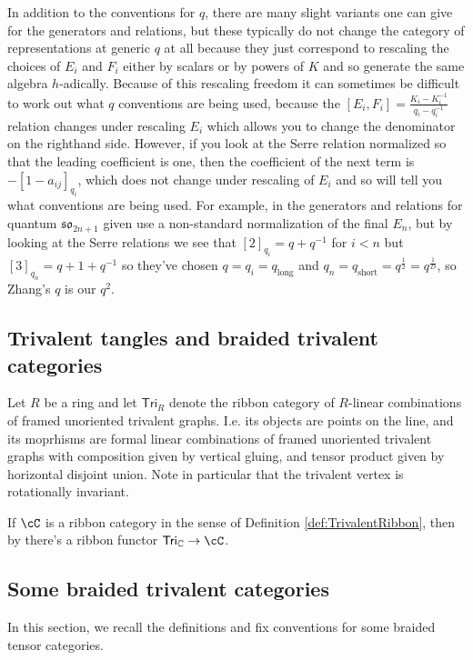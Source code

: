 \documentclass[12pt]{amsart}
\begin{document}
In addition to the conventions for $q$, 
there are many slight variants one can give for the generators and relations, but these typically
do not change the category of representations at generic $q$ at all because they just correspond to rescaling the
choices of $E_i$ and $F_i$ either by scalars or by powers of $K$ and so generate the same algebra $h$-adically.
Because of this rescaling freedom it can sometimes be difficult to work out what $q$ conventions are being used,
because the $[E_i,F_i] = \frac{K_i-K_i^{-1}}{q_i-q_i^{-1}}$ relation changes under rescaling $E_i$ which allows
you to change the denominator on the righthand side.  However, if you look at the Serre relation normalized
so that the leading coefficient is one, then the coefficient of the next term is $-[1-a_{ij}]_{q_i}$, which does not change
under rescaling of $E_i$ and so will tell you what conventions are being used.  For example, in \cite{MR1188811}
the generators and relations for quantum $\mathfrak{so}_{2n+1}$ given use a non-standard normalization of the
final $E_n$, but by looking at the Serre relations we see that $[2]_{q_i} = q+q^{-1}$  for 
$i < n$ but $[3]_{q_n} = q+1+q^{-1}$ so they've chosen $q=q_i=q_{\mathrm{long}}$ and $q_n = q_{\mathrm{short}} = q^{\frac{1}{2}} = q^{\frac{1}{D}}$, so Zhang's $q$ is our $q^2$.

\subsection{Trivalent tangles and braided trivalent categories}

Let $R$ be a ring and let $\mathsf{Tri}_R$ denote the ribbon category of $R$-linear combinations of framed unoriented trivalent graphs.  I.e. its objects are points on the line, and its moprhisms are formal linear combinations of framed unoriented trivalent graphs with composition given by vertical gluing, and tensor product given by horizontal disjoint union.  Note in particular that the trivalent vertex is rotationally invariant.

If $\cC$ is a ribbon category in the sense of Definition \ref{def:TrivalentRibbon}, then by \cite[Lemma 8.2]{MR3624901} there's a ribbon functor $\mathsf{Tri}_{\mathbb{C}} \rightarrow \cC$.


\subsection{Some braided trivalent categories}
In this section, we recall the definitions and fix conventions for some braided tensor categories.
\end{document}
